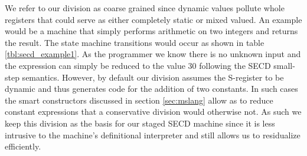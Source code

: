 \documentclass[fleqn]{article}
\theoremstyle{definition}
\begin{document}
We refer to our division as coarse grained since dynamic values pollute whole registers that could serve as either completely static or mixed valued. An example would be a machine that simply performs arithmetic on two integers and returns the result. The state machine transitions would occur as shown in table \ref{tbl:secd_example1}. As the programmer we know there is no unknown input and the expression can simply be reduced to the value 30 following the SECD small-step semantics. However, by default our division assumes the S-register to be dynamic and thus generates code for the addition of two constants. In such cases the smart constructors discussed in section \ref{sec:mslang} allow as to reduce constant expressions that a conservative division would otherwise not. As such we keep this division as the basis for our staged SECD machine since it is less intrusive to the machine's definitional interpreter and still allows us to residualize efficiently.
\end{document}
